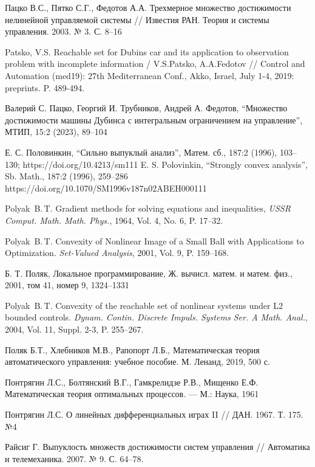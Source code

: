 \documentclass[../main.tex]{subfiles}
\begin{document}
\begin{thebibliography}{99}
Пацко В.С., Пятко С.Г., Федотов А.А. Трехмерное множество достижимости нелинейной управляемой системы // Известия РАН. Теория и системы управления. 2003. № 3. С. 8--16

Patsko, V.S. Reachable set for Dubins car and its application to observation problem with incomplete information / V.S.Patsko, A.A.Fedotov // Control and Automation (med19): 27th Mediterranean Conf., Akko, Israel, July 1-4, 2019: preprints. P. 489-494. 

Валерий С. Пацко, Георгий И. Трубников, Андрей А. Федотов, “Множество достижимости машины Дубинса с интегральным ограничением на управление”, МТИП, 15:2 (2023), 89–104

Е. С. Половинкин, “Сильно выпуклый анализ”, Матем. сб., 187:2 (1996), 103–130;  https://doi.org/10.4213/sm111 
E. S. Polovinkin, “Strongly convex analysis”, Sb. Math., 187:2 (1996), 259–286 https://doi.org/10.1070/SM1996v187n02ABEH000111

Polyak~B.\,T. Gradient methods for solving equations and inequalities, \emph{USSR Comput. Math. Math. Phys.}, 1964, Vol. 4, No. 6, P. 17–32.

Polyak~B.\,T. Convexity of Nonlinear Image of a Small Ball with Applications to Optimization. \emph{Set-Valued Analysis}, 2001, Vol. 9, P. 159–168.

Б. Т. Поляк, Локальное программирование, Ж. вычисл. матем. и матем. физ., 2001, том 41, номер 9, 1324–1331

Polyak~B.\,T. Convexity of the reachable set of nonlinear systems under L2 bounded controls. \emph{Dynam. Contin. Discrete Impuls. Systems Ser. A Math. Anal.}, 2004, Vol. 11, Suppl. 2-3,  P. 255–267.


Поляк Б.Т., Хлебников М.В., Рапопорт Л.Б., Математическая теория автоматического управления: учебное пособие. М. Ленанд, 2019, 500 с.

Понтрягин Л.С., Болтянский В.Г., Гамкрелидзе Р.В., Мищенко Е.Ф. Математическая теория оптимальных процессов. — М.: Наука, 1961

Понтрягин Л.С. О линейных дифференциальных играх II // ДАН. 1967. Т. 175. №4

Райсиг Г. Выпуклость множеств достижимости систем управления // Автоматика и телемеханика. 2007. № 9. С. 64–78.


\end{thebibliography}
\end{document}
